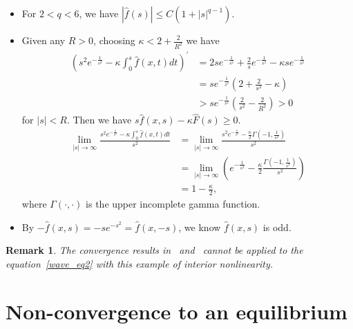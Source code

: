 \documentclass{elsarticle}
\newtheorem{remark}{Remark}[section]
\begin{document}
\begin{itemize}
\item[-] For $2<q< 6$, we have $|\hat{f}(s)|\leqslant C\left( 1+ |s|^{q-1} \right)$.
\item[-] Given any $R>0$, choosing $\kappa < 2+ \frac{2}{R^2}$ we have
\begin{equation*}
\begin{split}
	\left(s^{2}e^{-\frac{1}{s^2}} - \kappa\int^{s}_{0}\hat{f}(x, t) dt\right)^{\prime} &=2se^{-\frac{1}{s^2}}+\frac{2}{s}e^{-\frac{1}{s^2}}-\kappa s e^{-\frac{1}{s^2}} \\
	&= se^{-\frac{1}{s^2}}\left( 2+ \frac{2}{s^2} - \kappa \right)\\
	& > se^{-\frac{1}{s^2}}\left( \frac{2}{s^2} -  \frac{2}{R^2} \right) >0
\end{split}
\end{equation*}
for $|s| < R$. Then we have $s\hat{f}(x, s)-\kappa\hat{F}(s) \geqslant 0$.
\begin{equation*}
\begin{split}
	\lim_{|s|\rightarrow\infty}\frac{s^{2}e^{-\frac{1}{s^2}} - \kappa\int^{s}_{0}\hat{f}(x, t) dt}{s^2}& = \lim_{|s|\rightarrow\infty}\frac{s^{2}e^{-\frac{1}{s^2}} - \frac{ \kappa}{2}\Gamma\left(-1, \frac{1}{s^2}\right)}{s^2} \\
	&= \lim_{|s|\rightarrow\infty}\left( e^{-\frac{1}{s^2}}  - \frac{ \kappa}{2}\frac{\Gamma\left(-1, \frac{1}{s^2}\right)}{s^2}\right)\\
	&=1-\frac{\kappa}{2},
\end{split}
\end{equation*}
where $\Gamma(\cdot, \cdot)$ is the upper incomplete gamma function.
\item[-] By $-\hat{f}(x, s)= -se^{-s^2} =\hat{f}(x, -s)$, we know $\hat{f}(x, s)$ is odd.
\end{itemize}

\begin{remark}
The convergence results in~{\rm\cite[Corollary 1.4]{CEL2002}} and~{\rm\cite[Corollary 2.8]{chueshov2004}} cannot be applied to the equation~\eqref{wave_eq2} with this example of interior nonlinearity.
\end{remark}


\section{Non-convergence to an equilibrium}
\label{sec:nonconvergence}
\end{document}
